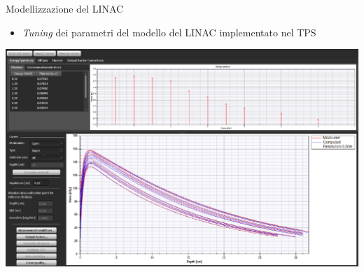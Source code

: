 \documentclass{beamer}
\begin{document}
\begin{frame}{Modellizzazione del LINAC}
\begin{itemize}
\scriptsize
{}
\item \alert{\textit{Tuning} dei parametri del modello del LINAC implementato nel TPS}
\end{itemize}
\vspace{.5cm}
\centering
\includegraphics[width=\textwidth]{./img/RayPhysics_gui.PNG}
\end{frame}
\end{document}
